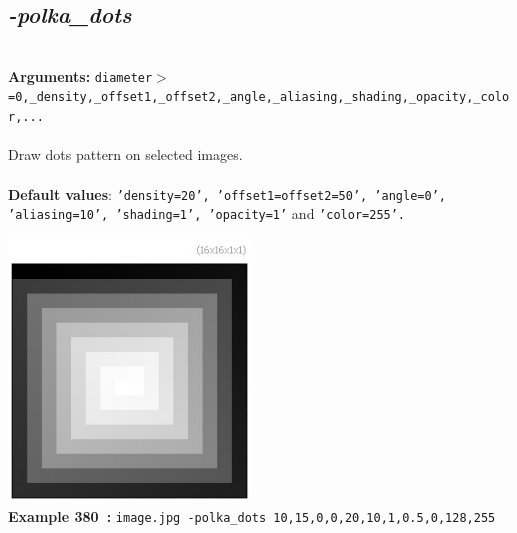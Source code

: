 \documentclass[a4paper,11pt,twoside]{book}
\begin{document}
\subsection{\emph{-polka\_dots} }\vspace*{-0.5em}
~\\\textbf{Arguments: } 
{\small \texttt{diameter$>$=0,\_density,\_offset1,\_offset2,\_angle,\_aliasing,\_shading,\_opacity,\_color,...}}\\~\\
Draw dots pattern on selected images.
~\\~\\\textbf{Default values}: {\small \texttt{'density=20', 'offset1=offset2=50', 'angle=0', 'aliasing=10', 'shading=1', 'opacity=1'} and \texttt{'color=255'.}}
\begin{center}\includegraphics[keepaspectratio=true,height=7cm,width=\textwidth]{img/gmic_def380.jpg}\\
{\footnotesize \textbf{Example 380~:} \texttt{image.jpg -polka\_dots 10,15,0,0,20,10,1,0.5,0,128,255}}
\end{center}
\end{document}
